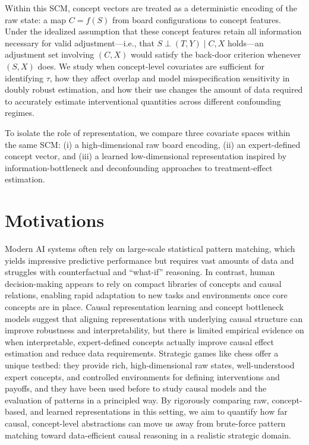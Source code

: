\documentclass[11pt]{article}
\begin{document}
Within this SCM, concept vectors are treated as a deterministic encoding of the
raw state: a map $C = f(S)$ from board configurations to concept features. Under
the idealized assumption that these concept features retain all information necessary
for valid adjustment---i.e., that $S \perp (T,Y) \mid C, X$ holds---an adjustment
set involving $(C, X)$ would satisfy the back-door criterion whenever $(S, X)$
does.\cite{pearl2009causality,scholkopf2021towards} We study when concept-level
covariates are sufficient for identifying $\tau$, how they affect overlap and model
misspecification sensitivity in doubly robust estimation, and how their use changes
the amount of data required to accurately estimate interventional quantities across
different confounding regimes.\cite{chernozhukov2018double,kuang2020information,deconfoundingScores}

To isolate the role of representation, we compare three covariate spaces within the
same SCM: (i) a high-dimensional raw board encoding, (ii) an expert-defined concept
vector, and (iii) a learned low-dimensional representation inspired by
information-bottleneck and deconfounding approaches to treatment-effect
estimation.\cite{kuang2020information,deconfoundingScores}

\section*{Motivations}

Modern AI systems often rely on large-scale statistical pattern matching, which
yields impressive predictive performance but requires vast amounts of data and
struggles with counterfactual and ``what-if'' reasoning.\cite{lake2017building,reasoningAIMag}
In contrast, human decision-making appears to rely on compact libraries of concepts
and causal relations, enabling rapid adaptation to new tasks and environments once
core concepts are in place.\cite{lake2017building,towardHumanLevelConcept} Causal
representation learning and concept bottleneck models suggest that aligning
representations with underlying causal structure can improve robustness and
interpretability, but there is limited empirical evidence on when interpretable,
expert-defined concepts actually improve causal effect estimation and reduce data
requirements.\cite{scholkopf2021towards,koh2020concept,fromCausalToConcept}
Strategic games like chess offer a unique testbed: they provide rich,
high-dimensional raw states, well-understood expert concepts, and controlled
environments for defining interventions and payoffs, and they have been used before
to study causal models and the evaluation of patterns in a principled
way.\cite{lemeire2005causalmodelsinchess,fortressesPaper,causalMaskingSpatial}
By rigorously comparing raw, concept-based, and learned representations in this
setting, we aim to quantify how far causal, concept-level abstractions can move us
away from brute-force pattern matching toward data-efficient causal reasoning in a
realistic strategic domain.\cite{scholkopf2021towards,causalReasoningRL,fromCausalToConcept}
\end{document}

